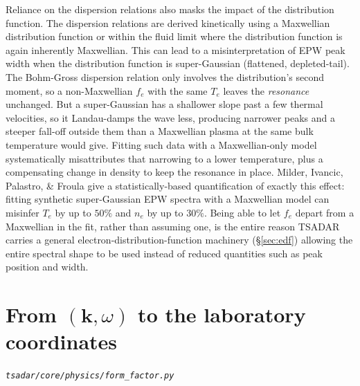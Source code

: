 \documentclass[11pt]{article}
\newcommand{\file}[1]{\texttt{#1}}
\begin{document}
Reliance on the dispersion relations also masks the impact of the distribution function. The dispersion relations are derived kinetically using a Maxwellian distribution function or within the fluid limit where the distribution function is again inherently Maxwellian. This can lead to a misinterpretation of EPW peak width when the distribution function is super-Gaussian (flattened, depleted-tail). The Bohm-Gross dispersion relation only involves the
distribution's second moment, so a non-Maxwellian $f_e$ with the same $T_e$ leaves the
\emph{resonance} unchanged. But a super-Gaussian has a shallower slope past a few thermal velocities, so it Landau-damps the
wave less, producing narrower peaks and a steeper fall-off outside them than a Maxwellian
plasma at the same bulk temperature would give. Fitting such data with a Maxwellian-only
model systematically misattributes that narrowing to a lower temperature, plus a
compensating change in density to keep the resonance in place. Milder, Ivancic, Palastro,
\& Froula \cite{milder2019} give a statistically-based quantification of exactly this
effect: fitting synthetic super-Gaussian EPW spectra with a Maxwellian model can misinfer
$T_e$ by up to $50\%$ and $n_e$ by up to $30\%$. Being able to
let $f_e$ depart from a Maxwellian in the fit, rather than assuming one, is the entire
reason TSADAR carries a general electron-distribution-function machinery
(\S\ref{sec:edf}) allowing the entire spectral shape to be used instead of reduced quantities such as peak position and width.

\section{From $(\mathbf k,\omega)$ to the laboratory coordinates}\label{sec:freqk}
\textit{\file{tsadar/core/physics/form\_factor.py}}
\end{document}
